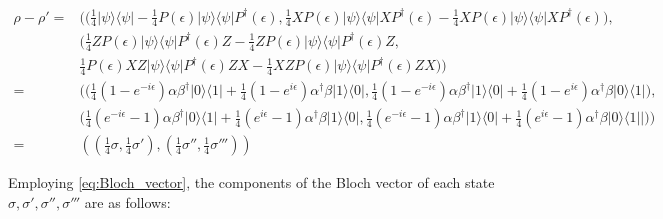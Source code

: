 \begin{equation}
\begin{split}
\rho-\rho' = & \Big(\Big(\frac{1}{4} |\psi\rangle \langle \psi| - \frac{1}{4} P(\epsilon)|\psi\rangle \langle \psi| P^{\dag}(\epsilon), \frac{1}{4} XP(\epsilon)|\psi\rangle \langle \psi|XP^{\dag}(\epsilon) - \frac{1}{4} XP(\epsilon)|\psi\rangle \langle \psi|XP^{\dag}(\epsilon)\Big),\\
&\Big(\frac{1}{4} ZP(\epsilon)|\psi\rangle \langle \psi|P^{\dag}(\epsilon)Z - \frac{1}{4} ZP(\epsilon)|\psi\rangle \langle \psi|P^{\dag}(\epsilon)Z, \\
& \frac{1}{4}P(\epsilon)  XZ|\psi\rangle \langle \psi|P^{\dag}(\epsilon)ZX - \frac{1}{4}  XZP(\epsilon) |\psi\rangle \langle \psi|P^{\dag}(\epsilon)ZX \Big)\Big)\\
= &\Big(\Big(\frac{1}{4}(1-e^{-i\epsilon}) \alpha \beta^{\dag} |0\rangle \langle 1 | + \frac{1}{4}(1-e^{i\epsilon}) \alpha^{\dag} \beta |1\rangle \langle 0 |,\frac{1}{4}(1-e^{-i\epsilon}) \alpha \beta^{\dag} |1\rangle \langle 0 | + \frac{1}{4}(1-e^{i\epsilon}) \alpha^{\dag} \beta |0\rangle \langle 1 |\Big) , \\
& \Big(\frac{1}{4}(e^{-i\epsilon}-1) \alpha \beta^{\dag} |0\rangle \langle 1 | + \frac{1}{4}(e^{i\epsilon}-1) \alpha^{\dag} \beta |1\rangle \langle 0 |, \frac{1}{4}(e^{-i\epsilon}-1) \alpha \beta^{\dag} |1\rangle \langle 0 | + \frac{1}{4}(e^{i\epsilon}-1) \alpha^{\dag} \beta |0\rangle \langle 1 | |\Big)\Big)\\
= & \left(\left(\frac{1}{4}\sigma,\frac{1}{4}\sigma'\right),\left(\frac{1}{4}\sigma'',\frac{1}{4}\sigma'''\right)\right)
\end{split}
\end{equation}


Employing \autoref{eq:Bloch_vector}, the components of the Bloch vector of each state $\sigma,\sigma',\sigma'',\sigma'''$ are as follows:

